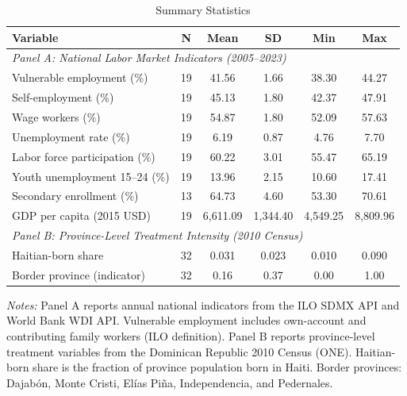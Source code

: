 \begin{table}[H]
\centering
\caption{Summary Statistics}
\begin{threeparttable}
\begin{tabular}{lccccc}
\toprule
Variable & N & Mean & SD & Min & Max \\
\midrule
\multicolumn{6}{l}{\textit{Panel A: National Labor Market Indicators (2005--2023)}} \\
Vulnerable employment (\%) & 19 & 41.56 & 1.66 & 38.30 & 44.27 \\
Self-employment (\%) & 19 & 45.13 & 1.80 & 42.37 & 47.91 \\
Wage workers (\%) & 19 & 54.87 & 1.80 & 52.09 & 57.63 \\
Unemployment rate (\%) & 19 & 6.19 & 0.87 & 4.76 & 7.70 \\
Labor force participation (\%) & 19 & 60.22 & 3.01 & 55.47 & 65.19 \\
Youth unemployment 15--24 (\%) & 19 & 13.96 & 2.15 & 10.60 & 17.41 \\
Secondary enrollment (\%) & 13 & 64.73 & 4.60 & 53.30 & 70.61 \\
GDP per capita (2015 USD) & 19 & 6,611.09 & 1,344.40 & 4,549.25 & 8,809.96 \\
\midrule
\multicolumn{6}{l}{\textit{Panel B: Province-Level Treatment Intensity (2010 Census)}} \\
Haitian-born share & 32 & 0.031 & 0.023 & 0.010 & 0.090 \\
Border province (indicator) & 32 & 0.16 & 0.37 & 0.00 & 1.00 \\
\bottomrule
\end{tabular}
\begin{tablenotes}[flushleft]
\small
\item \textit{Notes:} Panel A reports annual national indicators from the ILO SDMX API and World Bank WDI API. Vulnerable employment includes own-account and contributing family workers (ILO definition). Panel B reports province-level treatment variables from the Dominican Republic 2010 Census (ONE). Haitian-born share is the fraction of province population born in Haiti. Border provinces: Dajab\'{o}n, Monte Cristi, El\'{i}as Pi\~{n}a, Independencia, and Pedernales.
\end{tablenotes}
\end{threeparttable}
\label{tab:summary}
\end{table}

